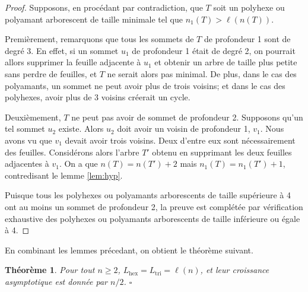 \documentclass{article}
\newtheorem{thm}{Théorème}[section]
\theoremstyle{definition}
\newcommand{\Lhex}{L_{\text{hex}}}
\newcommand{\Ltri}{L_{\text{tri}}}
\begin{document}
\begin{proof}
   Supposons, en procédant par contradiction, que $T$ soit un
   polyhexe ou polyamant arborescent de taille minimale 
   tel que $n_1(T) > \ell(n(T))$.

   Premièrement, remarquons que tous les sommets de $T$ de profondeur 
   1 sont de degré 3. En effet, si un sommet $u_1$ de profondeur 1 
   était de degré 2, on pourrait allors supprimer la feuille adjacente 
   à $u_1$ et obtenir un arbre de taille plus petite sans perdre 
   de feuilles, et $T$ ne serait alors pas minimal. De plus, dans 
   le cas des polyamants, un sommet ne peut avoir plus de trois
   voisins; et dans le cas des polyhexes, avoir plus de 3 voisins
   créerait un cycle.

   Deuxièmement, $T$ ne peut pas avoir de sommet de profondeur 2. 
   Supposons qu'un tel sommet $u_2$ existe. Alors $u_2$ doit avoir un 
   voisin de profondeur 1, $v_1$. Nous avons vu que $v_1$ devait avoir 
   trois voisins. Deux d'entre eux sont nécessairement des feuilles. 
   Considérons alors l'arbre $T'$ obtenu en supprimant les deux feuilles 
   adjacentes à $v_1$. On a que $n(T) = n(T') + 2$ mais $n_1(T) = 
   n_1(T') + 1$, contredisant le lemme \ref{lem:hyp}.

   Puisque tous les polyhexes ou polyamants arborescents de taille 
   supé\-rieure à 4 ont au moins un sommet de profondeur 2, la preuve est 
   complétée par vérification exhaustive des polyhexes ou 
   polyamants arborescents de taille infé\-rieure ou égale à 4.
\end{proof}

En combinant les lemmes précedant, on obtient le théorème suivant.

\begin{thm}
   Pour tout $n \geq 2$, $\Lhex = \Ltri = \ell(n)$, et leur croissance
   asymptotique est donnée par $n/2$. \hfill $\square$
\end{thm}
\end{document}
